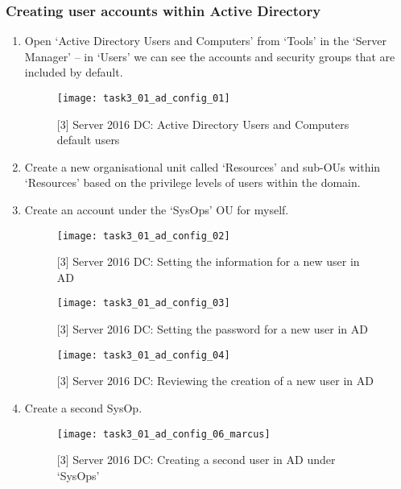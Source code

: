 \subsubsection{Creating user accounts within Active Directory}
\begin{enumerate}[series=task3methodology2]
  \item Open `Active Directory Users and Computers' from `Tools' in the `Server Manager' -- in `Users' we can see the accounts and security groups that are included by default.
    \begin{figure}[H]
      \centering
      \captionsetup{skip=2pt}
      \texttt{[image: task3\_01\_ad\_config\_01]}
      \caption{[3] Server 2016 DC: Active Directory Users and Computers default users}
      \label{fig:task3:ad_config_01}
    \end{figure}
  \item Create a new organisational unit called `Resources' and sub-OUs within `Resources' based on the privilege levels of users within the domain.
  \item Create an account under the `SysOps' OU for myself.
    \begin{figure}[H]
      \centering
      \captionsetup{skip=2pt}
      \texttt{[image: task3\_01\_ad\_config\_02]}
      \caption{[3] Server 2016 DC: Setting the information for a new user in AD}
      \label{fig:task3:ad_config_02}
    \end{figure}
    \begin{figure}[H]
      \centering
      \captionsetup{skip=2pt}
      \texttt{[image: task3\_01\_ad\_config\_03]}
      \caption{[3] Server 2016 DC: Setting the password for a new user in AD}
      \label{fig:task3:ad_config_03}
    \end{figure}
    \begin{figure}[H]
      \centering
      \captionsetup{skip=2pt}
      \texttt{[image: task3\_01\_ad\_config\_04]}
      \caption{[3] Server 2016 DC: Reviewing the creation of a new user in AD}
      \label{fig:task3:ad_config_04}
    \end{figure}
  \item Create a second SysOp.
    \begin{figure}[H]
      \centering
      \captionsetup{skip=2pt}
      \texttt{[image: task3\_01\_ad\_config\_06\_marcus]}
      \caption{[3] Server 2016 DC: Creating a second user in AD under `SysOps'}
      \label{fig:task3:ad_config_06}
    \end{figure}

\end{enumerate}
